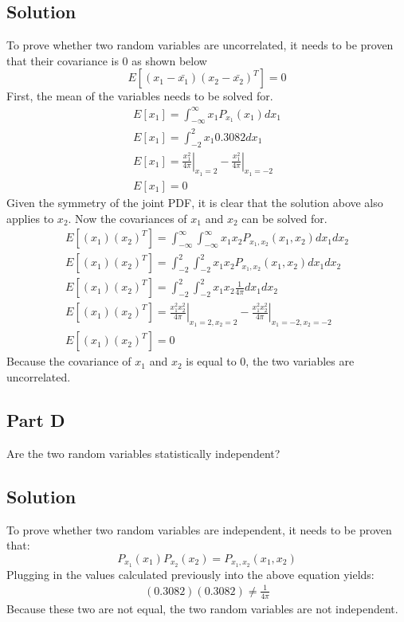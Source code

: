 \documentclass{article}
\begin{document}
\subsection*{Solution}
To prove whether two random variables are uncorrelated, it needs to be proven that their covariance is 0 as shown below
\begin{equation}
    E\left[(x_1 - \bar{x_1})(x_2 - \bar{x_2})^T\right] = 0
\end{equation}
First, the mean of the variables needs to be solved for.
\begin{gather*}
    E\left[x_1\right] = \int_{-\infty}^{\infty} x_1 P_{x_1}(x_1)dx_1 \\
    E\left[x_1\right] = \int_{-2}^{2} x_1 0.3082dx_1 \\
    E\left[x_1\right] = \left .\frac{x_1^2}{4\pi}\right\rvert_{x_1=2} - \left .\frac{x_1^2}{4\pi}\right\rvert_{x_1=-2} \\
    E\left[x_1\right] = 0
\end{gather*}
Given the symmetry of the joint PDF, it is clear that the solution above also applies to $x_2$.  Now the covariances of
$x_1$ and $x_2$ can be solved for.
\begin{gather*}
    E\left[(x_1)(x_2)^T\right] = \int_{-\infty}^{\infty}\int_{-\infty}^{\infty} x_1 x_2 P_{x_1, x_2}(x_1,x_2)dx_1 dx_2 \\
    E\left[(x_1)(x_2)^T\right] = \int_{-2}^{2}\int_{-2}^{2} x_1 x_2 P_{x_1, x_2}(x_1,x_2)dx_1 dx_2 \\
    E\left[(x_1)(x_2)^T\right] = \int_{-2}^{2}\int_{-2}^{2} x_1 x_2 \frac{1}{4\pi} dx_1 dx_2 \\
    E\left[(x_1)(x_2)^T\right] = \left .\frac{x_1^2 x_2^2}{4\pi}\right\rvert_{x_1=2, x_2=2} - \left .\frac{x_1^2 x_2^2}{4\pi}\right\rvert_{x_1=-2, x_2=-2} \\
    E\left[(x_1)(x_2)^T\right] = 0
\end{gather*}
Because the covariance of $x_1$ and $x_2$ is equal to 0, the two variables are uncorrelated.

\subsection*{Part D}
Are the two random variables statistically independent?
\subsection*{Solution}
To prove whether two random variables are independent, it needs to be proven that:
\begin{equation}
    P_{x_1}(x_1)P_{x_2}(x_2) = P_{x_1,x_2}(x_1,x_2)
\end{equation}
Plugging in the values calculated previously into the above equation yields:
\begin{gather*}
    (0.3082)(0.3082) \neq \frac{1}{4\pi}
\end{gather*}
Because these two are not equal, the two random variables are not independent.
\end{document}
